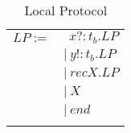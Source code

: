   
  
  
  
  \vspace{0.5cm}
  \begin{table}[H]
  \begin{center}
  \begin{tabular}{r l}
      $LP:=$  & $\ \  x?:t_b.LP$ \\
       & $|\ y!:t_b.LP$\\
       & $|\ recX.LP$\\
       & $|\ X$ \\
       & $|\ end$\\
       & \\
       
  \end{tabular}
    \end{center}
\caption {Local Protocol} \label{tab:localprotocol}
\end{table}



